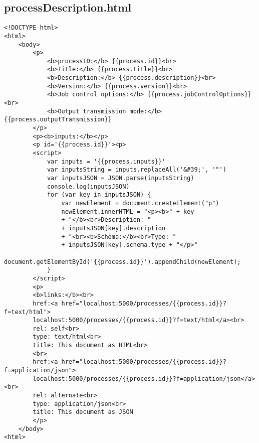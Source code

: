 \subsection{processDescription.html}
\begin{lstlisting}[caption={processDescription.html}, style = HTML]
<!DOCTYPE html>
<html>
	<body>
        <p>
            <b>processID:</b> {{process.id}}<br>
            <b>Title:</b> {{process.title}}<br>
            <b>Description:</b> {{process.description}}<br>
            <b>Version:</b> {{process.version}}<br>
            <b>Job control options:</b> {{process.jobControlOptions}}<br>
            <b>Output transmission mode:</b> {{process.outputTransmission}}
        </p>
        <p><b>inputs:</b></p>
        <p id='{{process.id}}'><p>
        <script>
            var inputs = '{{process.inputs}}'
            var inputsString = inputs.replaceAll('&#39;', '"')
            var inputsJSON = JSON.parse(inputsString)
            console.log(inputsJSON)
            for (var key in inputsJSON) {
                var newElement = document.createElement("p")
                newElement.innerHTML = "<p><b>" + key 
                + "</b><br>Description: " 
                + inputsJSON[key].description 
                + "<br><b>Schema:</b><br>Type: " 
                + inputsJSON[key].schema.type + "</p>"
                document.getElementById('{{process.id}}').appendChild(newElement);
            }
        </script>
        <p>
        <b>links:</b><br>
        href:<a href="localhost:5000/processes/{{process.id}}?f=text/html">
        localhost:5000/processes/{{process.id}}?f=text/html</a><br>
        rel: self<br>
        type: text/html<br>
        title: This document as HTML<br>
        <br>
        href:<a href="localhost:5000/processes/{{process.id}}?f=application/json">
        localhost:5000/processes/{{process.id}}?f=application/json</a><br>
        rel: alternate<br>
        type: application/json<br>
        title: This document as JSON
		</p>
	</body>
<html>
\end{lstlisting}\label{appendixprocessDescriptionHTML}  

